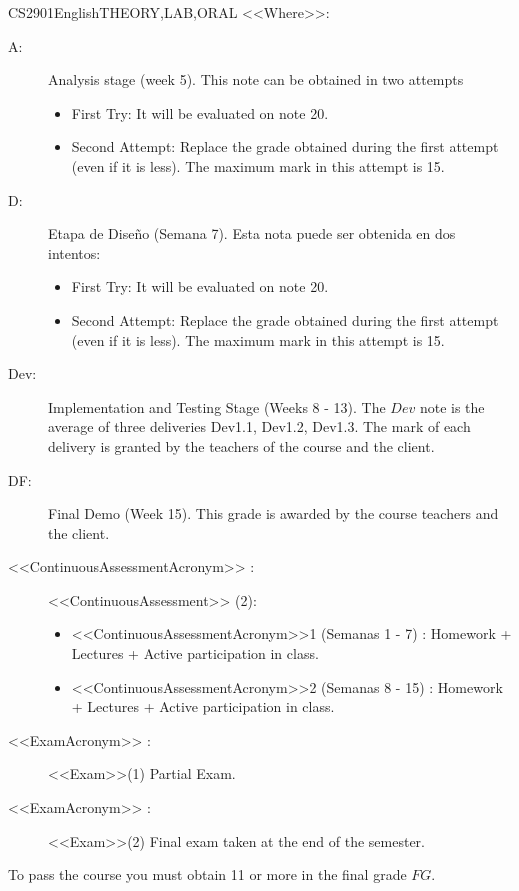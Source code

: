 \begin{evaluation}{CS2901}{English}{THEORY,LAB,ORAL}
    \vspace{2mm}
    \noindent <<Where>>:
    \begin{description}
      \item[A:] Analysis stage (week 5). This note can be obtained in two attempts
        \begin{itemize}
          \item[] First Try: It will be evaluated on note 20.
          \item[] Second Attempt: Replace the grade obtained during the first attempt (even if it is less). The maximum mark in this attempt is 15.
        \end{itemize}
      \item[D:] Etapa de Diseño (Semana 7). Esta nota puede ser obtenida en dos intentos:
        \begin{itemize}
          \item[] First Try: It will be evaluated on note 20.
          \item[] Second Attempt: Replace the grade obtained during the first attempt (even if it is less). The maximum mark in this attempt is 15.
        \end{itemize}
      \item[Dev:] Implementation and Testing Stage (Weeks 8 - 13). The $Dev$ note is the average of three deliveries Dev1.1, Dev1.2, Dev1.3. The mark of each delivery is granted by the teachers of the course and the client.
      \item[DF:] Final Demo (Week 15). This grade is awarded by the course teachers and the client.
      \item[<<ContinuousAssessmentAcronym>> :] <<ContinuousAssessment>> (2):
        \begin{itemize}
            \item  <<ContinuousAssessmentAcronym>>1 (Semanas 1 - 7)  : Homework + Lectures + Active participation in class.
            \item <<ContinuousAssessmentAcronym>>2 (Semanas 8 - 15) : Homework + Lectures + Active participation in class.
        \end{itemize}
      \item[<<ExamAcronym>> :]  <<Exam>>(1) Partial Exam.
      \item[<<ExamAcronym>> :]  <<Exam>>(2) Final exam taken at the end of the semester.
    \end{description}
 
  \noindent To pass the course you must obtain 11 or more in the final grade $FG$.
  \end{evaluation}


